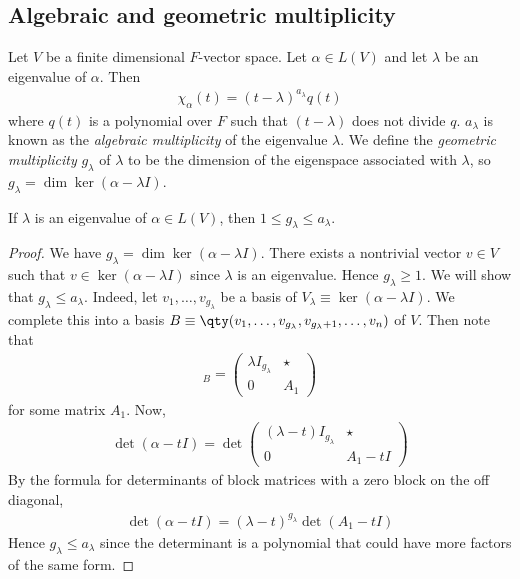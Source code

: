 \subsection{Algebraic and geometric multiplicity}
\begin{definition}
	Let $V$ be a finite dimensional $F$-vector space.
	Let $\alpha \in L(V)$ and let $\lambda$ be an eigenvalue of $\alpha$.
	Then
	\begin{align*}
		\chi_\alpha(t) = (t-\lambda)^{a_\lambda} q(t)
	\end{align*}
	where $q(t)$ is a polynomial over $F$ such that $(t-\lambda)$ does not divide $q$.
	$a_\lambda$ is known as the \textit{algebraic multiplicity} of the eigenvalue $\lambda$.
	We define the \textit{geometric multiplicity} $g_\lambda$ of $\lambda$ to be the dimension of the eigenspace associated with $\lambda$, so $g_\lambda = \dim \ker (\alpha - \lambda I)$.
\end{definition}
\begin{lemma}
	If $\lambda$ is an eigenvalue of $\alpha \in L(V)$, then $1 \leq g_\lambda \leq a_\lambda$.
\end{lemma}
\begin{proof}
	We have $g_\lambda = \dim \ker (\alpha - \lambda I)$.
	There exists a nontrivial vector $v \in V$ such that $v \in \ker(\alpha - \lambda I)$ since $\lambda$ is an eigenvalue.
	Hence $g_\lambda \geq 1$.
	We will show that $g_\lambda \leq a_\lambda$.
	Indeed, let $v_1, \dots, v_{g_\lambda}$ be a basis of $V_\lambda \equiv \ker (\alpha - \lambda I)$.
	We complete this into a basis $B \equiv \qty(v_1, \dots, v_{g_\lambda}, v_{g_\lambda + 1}, \dots, v_n)$ of $V$.
	Then note that
	\begin{align*}
		[\alpha]_B = \begin{pmatrix}
			\lambda I_{g_\lambda} & \star \\
			0                     & A_1
		\end{pmatrix}
	\end{align*}
	for some matrix $A_1$.
	Now,
	\begin{align*}
		\det (\alpha - tI) = \det \begin{pmatrix}
			(\lambda - t) I_{g_\lambda} & \star     \\
			0                           & A_1 - t I
		\end{pmatrix}
	\end{align*}
	By the formula for determinants of block matrices with a zero block on the off diagonal,
	\begin{align*}
		\det (\alpha - tI) = (\lambda-t)^{g_\lambda} \det(A_1 - t I)
	\end{align*}
	Hence $g_\lambda \leq a_\lambda$ since the determinant is a polynomial that could have more factors of the same form.
\end{proof}
